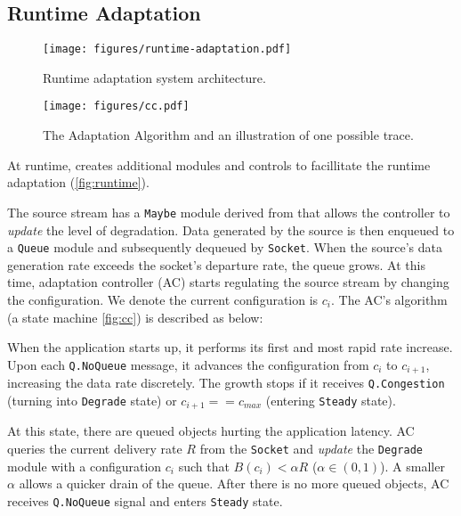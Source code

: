 \subsection{Runtime Adaptation}
\label{sec:runtime}

\begin{figure}
  \centering
  \texttt{[image: figures/runtime-adaptation.pdf]}
  \caption{Runtime adaptation system architecture.}
  \label{fig:runtime}
\end{figure}

\begin{figure}
  \centering
  \texttt{[image: figures/cc.pdf]}
  \caption{The Adaptation Algorithm and an illustration of one possible trace.}
  \label{fig:cc}
\end{figure}

At runtime, \sysname{} creates additional modules and controls to facillitate
the runtime adaptation (\autoref{fig:runtime}).

The source stream has a \texttt{Maybe} module derived from \maybe{} that allows
the controller to \textit{update} the level of degradation. Data generated by
the source is then enqueued to a \texttt{Queue} module and subsequently dequeued
by \texttt{Socket}. When the source's data generation rate exceeds the socket's
departure rate, the queue grows. At this time, adaptation controller (AC) starts
regulating the source stream by changing the configuration. We denote the
current configuration is $c_i$. The AC's algorithm (a state machine
\autoref{fig:cc}) is described as below:

 When the application starts up, it performs its
first and most rapid rate increase. Upon each \texttt{Q.NoQueue} message, it
advances the configuration from $c_i$ to $c_{i+1}$, increasing the data rate
discretely. The growth stops if it receives \texttt{Q.Congestion} (turning into
\texttt{Degrade} state) or $c_{i+1} == c_{max}$ (entering \texttt{Steady}
state).

 At this state, there are queued objects
hurting the application latency. AC queries the current delivery rate $R$ from
the \texttt{Socket} and \textit{update} the \texttt{Degrade} module with a
configuration $c_i$ such that $B(c_i) < \alpha R$ ($\alpha \in (0, 1)$). A
smaller $\alpha$ allows a quicker drain of the queue. After there is no more
queued objects, AC receives \texttt{Q.NoQueue} signal and enters \texttt{Steady}
state.

